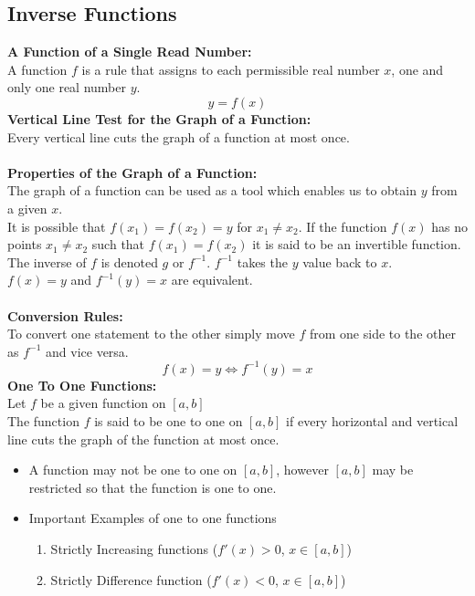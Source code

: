 \documentclass[14pt]{article}
\begin{document}
    \subsection{Inverse Functions}
    \textbf{A Function of a Single Read Number:}\\
    A function $f$ is a rule that assigns to each permissible real
    number $x$, one and only one real number $y$. $$y=f(x)$$
    \textbf{Vertical Line Test for the Graph of a Function:}\\
    Every vertical line cuts the graph of a function at most once.\\\\
    \textbf{Properties of the Graph of a Function:}\\
    The graph of a function can be used as a tool which enables us to
    obtain $y$ from a given $x$.\\
    It is possible that $f(x_1)=f(x_2)=y$ for $x_1\neq x_2$. If the
    function $f(x)$ has no points $x_1\neq x_2$ such that
    $f(x_1)=f(x_2)$ it is said to be an invertible function. The inverse
    of $f$ is denoted $g$ or $f^{-1}$. $f^{-1}$ takes the $y$ value back
    to $x$.\\ 
    $f(x)=y$ and $f^{-1}(y)=x$ are equivalent.\\\\
    \textbf{Conversion Rules:}\\
    To convert one statement to the other simply move $f$ from one side
    to the other as $f^{-1}$ and vice versa.
    $$f(x)=y \Leftrightarrow f^{-1}(y)=x$$ \textbf{One To One
    Functions:}\\
    Let $f$ be a given function on $[a,b]$\\
    The function $f$ is said to be one to one on $[a,b]$ if every
    horizontal and vertical line cuts the graph of the function at most
    once.
    \begin{itemize}
        \item A function may not be one to one on $[a,b]$, however
        $[a,b]$ may be restricted so that the function is one to one.
        \item Important Examples of one to one functions\begin{enumerate}
            \item Strictly Increasing functions ($f'(x)>0$, $x\in[a,b]$)
            \item Strictly Difference function ($f'(x)<0$, $x\in[a,b]$)
        \end{enumerate}
    \end{itemize}
\end{document}
